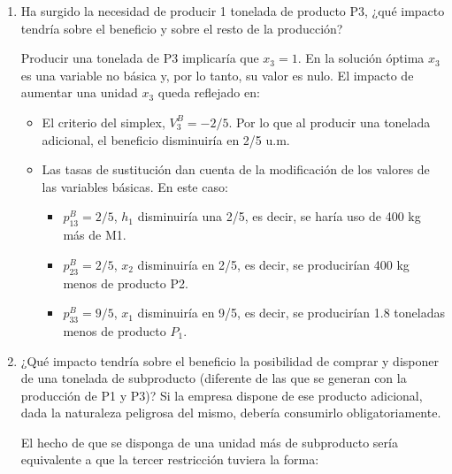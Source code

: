\begin{enumerate}
    Por lo tanto, se debe cumplir $\frac{16-9c_1}{5} \leq 0$ y $-\frac{2+2c_1}{5} \leq 0$, es decir, $\frac{16}{9} \leq c_1$ y $-1 \leq c_1$.

    Mientras el margen del producto P1 sea igual o superior a $\frac{16}{9} = 1.78$ (y lo es), la gama de productos es la que se indica en el apartado anterior.



    \item Ha surgido la necesidad de producir 1 tonelada de producto P3, ¿qué impacto tendría sobre el beneficio y sobre el resto de la producción?

    Producir una tonelada de P3 implicaría que $x_3 = 1$. En la solución óptima $x_3$ es una variable no básica y, por lo tanto, su valor es nulo. El impacto de aumentar una unidad $x_3$ queda reflejado en:

    \begin{itemize}
        \item El criterio del simplex, $V^B_3 = -2/5$. Por lo que al producir una tonelada adicional, el beneficio disminuiría en 2/5 u.m.
        \item Las tasas de sustitución dan cuenta de la modificación de los valores de las variables básicas. En este caso:
        \begin{itemize}
            \item $p^B_{13} = 2/5$, $h_1$ disminuiría una 2/5, es decir, se haría uso de 400 kg más de M1.
            \item $p^B_{23} = 2/5$, $x_2$ disminuiría en 2/5, es decir, se producirían 400 kg menos de producto P2.
            \item $p^B_{33} = 9/5$, $x_1$ disminuiría en 9/5, es decir, se producirían 1.8 toneladas menos de producto $P_1$.
        \end{itemize}
    \end{itemize}

     
    
    \item ¿Qué impacto tendría sobre el beneficio la posibilidad de comprar y disponer de una tonelada de subproducto (diferente de las que se generan con la producción de P1 y P3)? Si la empresa dispone de ese producto adicional, dada la naturaleza peligrosa del mismo, debería consumirlo obligatoriamente.

    El hecho de que se disponga de una unidad más de subproducto sería equivalente a que la tercer restricción tuviera la forma:
    

\end{enumerate}
